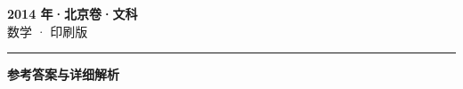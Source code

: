 \documentclass[zihao=5, a4paper]{ctexart}
\begin{document}
\begin{center}
  {\Large\bfseries 2014 年·北京卷·文科}\\[4pt]
  {\large 数学 · 印刷版}
\end{center}
\medskip
{}

\par\bigskip\hrule\bigskip
{}
\Needspace{0.55\textheight}
\begin{center}{\large\bfseries 参考答案与详细解析}\end{center}
\smallskip

\end{document}
